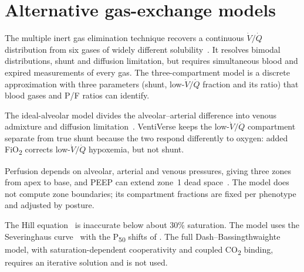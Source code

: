\section{Alternative gas-exchange models}
\label{sec:gx-alt}
\begin{description}[leftmargin=1em]
\item[MIGET.] The multiple inert gas elimination technique recovers a continuous $\dot V/\dot Q$ distribution from six gases of widely different solubility~\citep{wagner1974}. It resolves bimodal distributions, shunt and diffusion limitation, but requires simultaneous blood and expired measurements of every gas. The three-compartment model is a discrete approximation with three parameters (shunt, low-$\dot V/\dot Q$ fraction and its ratio) that blood gases and P/F ratios can identify.
\item[Riley--Cournand.] The ideal-alveolar model divides the alveolar--arterial difference into venous admixture and diffusion limitation~\citep{riley1949}. VentiVerse keeps the low-$\dot V/\dot Q$ compartment separate from true shunt because the two respond differently to oxygen: added FiO\textsubscript{2} corrects low-$\dot V/\dot Q$ hypoxemia, but not shunt.
\item[West zones.] Perfusion depends on alveolar, arterial and venous pressures, giving three zones from apex to base, and PEEP can extend zone~1 dead space~\citep{west1964}. The model does not compute zone boundaries; its compartment fractions are fixed per phenotype and adjusted by posture.
\item[Dissociation curve.] The Hill equation~\citep{hill1910} is inaccurate below about 30\% saturation. The model uses the Severinghaus curve~\citep{severinghaus1979} with the P\textsubscript{50} shifts of \citet{dash2016}. The full Dash--Bassingthwaighte model, with saturation-dependent cooperativity and coupled CO\textsubscript{2} binding, requires an iterative solution and is not used.
\end{description}

